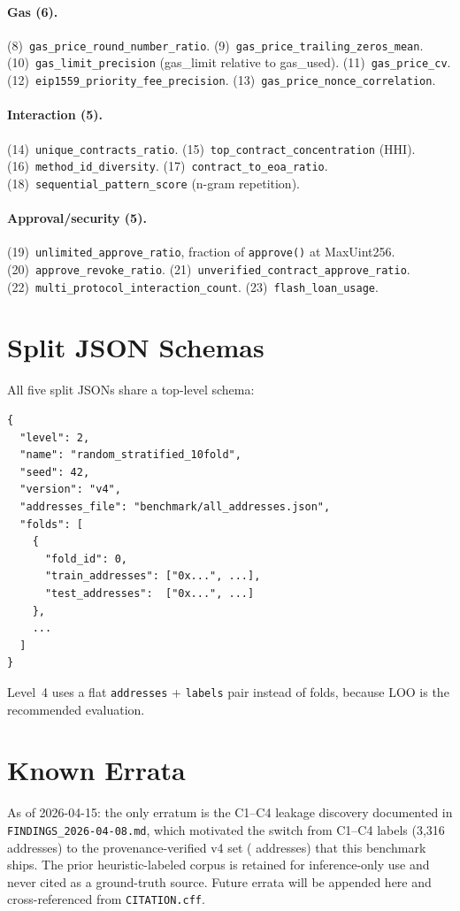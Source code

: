 \documentclass[10pt]{article}
\begin{document}
\paragraph{Gas (6).}
(8)~\texttt{gas\_price\_round\_number\_ratio}. (9)~\texttt{gas\_price\_trailing\_zeros\_mean}. (10)~\texttt{gas\_limit\_precision} (gas\_limit relative to gas\_used). (11)~\texttt{gas\_price\_cv}. (12)~\texttt{eip1559\_priority\_fee\_precision}. (13)~\texttt{gas\_price\_nonce\_correlation}.

\paragraph{Interaction (5).}
(14)~\texttt{unique\_contracts\_ratio}. (15)~\texttt{top\_contract\_concentration} (HHI). (16)~\texttt{method\_id\_diversity}. (17)~\texttt{contract\_to\_eoa\_ratio}. (18)~\texttt{sequential\_pattern\_score} (n-gram repetition).

\paragraph{Approval/security (5).}
(19)~\texttt{unlimited\_approve\_ratio}, fraction of \texttt{approve()} at MaxUint256. (20)~\texttt{approve\_revoke\_ratio}. (21)~\texttt{unverified\_contract\_approve\_ratio}. (22)~\texttt{multi\_protocol\_interaction\_count}. (23)~\texttt{flash\_loan\_usage}.

\section{Split JSON Schemas}
\label{app:splits}

All five split JSONs share a top-level schema:

\begin{verbatim}
{
  "level": 2,
  "name": "random_stratified_10fold",
  "seed": 42,
  "version": "v4",
  "addresses_file": "benchmark/all_addresses.json",
  "folds": [
    {
      "fold_id": 0,
      "train_addresses": ["0x...", ...],
      "test_addresses":  ["0x...", ...]
    },
    ...
  ]
}
\end{verbatim}
Level~4 uses a flat \texttt{addresses} + \texttt{labels} pair instead of folds, because LOO is the recommended evaluation.

\section{Known Errata}
\label{app:errata}

As of 2026-04-15: the only erratum is the C1--C4 leakage discovery documented in \texttt{FINDINGS\_2026-04-08.md}, which motivated the switch from C1--C4 labels (3{,}316 addresses) to the provenance-verified v4 set (\datasetNAddresses{} addresses) that this benchmark ships. The prior heuristic-labeled corpus is retained for inference-only use and never cited as a ground-truth source. Future errata will be appended here and cross-referenced from \texttt{CITATION.cff}.
\end{document}
